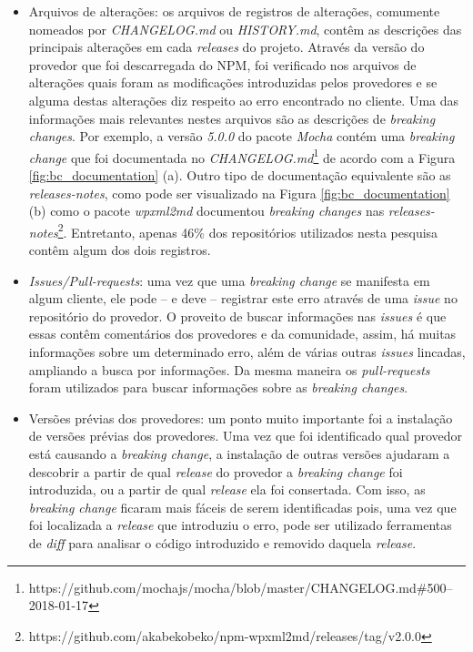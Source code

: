 \begin{itemize}
    \item Arquivos de alterações: os arquivos de registros de alterações, comumente nomeados por \textit{CHANGELOG.md} ou \textit{HISTORY.md}, contêm as descrições das principais alterações em cada \textit{releases} do projeto. Através da versão do provedor que foi descarregada do \gls{NPM}, foi verificado nos arquivos de alterações quais foram as modificações introduzidas pelos provedores e se alguma destas alterações diz respeito ao erro encontrado no cliente. Uma das informações mais relevantes nestes arquivos são as descrições de \textit{breaking changes}. Por exemplo, a versão \textit{5.0.0} do pacote \textit{Mocha} contém uma \textit{breaking change} que foi documentada no \textit{CHANGELOG.md}\footnote{https://github.com/mochajs/mocha/blob/master/CHANGELOG.md\#500--2018-01-17} de acordo com a Figura \ref{fig:bc_documentation} (a). Outro tipo de documentação equivalente são as \textit{releases-notes}, como pode ser visualizado na Figura \ref{fig:bc_documentation} (b) como o pacote \textit{wpxml2md} documentou \textit{breaking changes} nas \textit{releases-notes}\footnote{https://github.com/akabekobeko/npm-wpxml2md/releases/tag/v2.0.0}. Entretanto, apenas 46\% dos repositórios utilizados nesta pesquisa contêm algum dos dois registros.

    \item \textit{Issues/Pull-requests}: uma vez que uma \textit{breaking change} se manifesta em algum cliente, ele pode -- e deve -- registrar este erro através de uma \textit{issue} no repositório do provedor. O proveito de buscar informações nas \textit{issues} é que essas contêm comentários dos provedores e da comunidade, assim, há muitas informações sobre um determinado erro, além de várias outras \textit{issues} lincadas, ampliando a busca por informações. Da mesma maneira os \textit{pull-requests} foram utilizados para buscar informações sobre as \textit{breaking changes}.

    \item Versões prévias dos provedores: um ponto muito importante foi a instalação de versões prévias dos provedores. Uma vez que foi identificado qual provedor está causando a \textit{breaking change}, a instalação de outras versões ajudaram a descobrir a partir de qual \textit{release} do provedor a \textit{breaking change} foi introduzida, ou a partir de qual \textit{release} ela foi consertada. Com isso, as \textit{breaking change} ficaram mais fáceis de serem identificadas pois, uma vez que foi localizada a \textit{release} que introduziu o erro, pode ser utilizado ferramentas de \textit{diff} para analisar o código introduzido e removido daquela \textit{release}.


\end{itemize}
